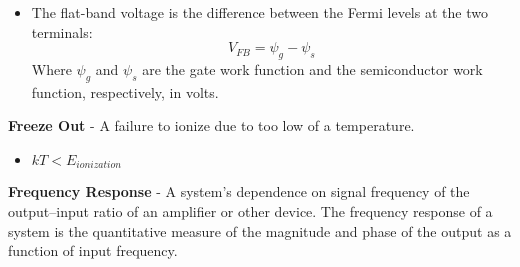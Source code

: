     \vspace{0.15cm}
    \begin{itemize}
        \setlength\itemsep{0.5em}
        \item The flat-band voltage is the difference between the Fermi levels at the two terminals:
        \begin{equation}
            V_{FB} = \psi_g - \psi_s
        \end{equation}
        Where $\psi_g$ and $\psi_s$ are the gate work function and the semiconductor work function, respectively, in volts.
    \end{itemize}
\vspace{0.5cm}
    \textbf{Freeze Out} - A failure to ionize due to too low of a temperature.
    \begin{itemize}
        \setlength\itemsep{0.5em}
        \item $kT < E_{ionization}$
    \end{itemize}
\vspace{0.5cm}
    \textbf{Frequency Response} - A system's dependence on signal frequency of the output–input ratio of an amplifier or other device.  The frequency response of a system is the quantitative measure of the magnitude and phase of the output as a function of input frequency.
